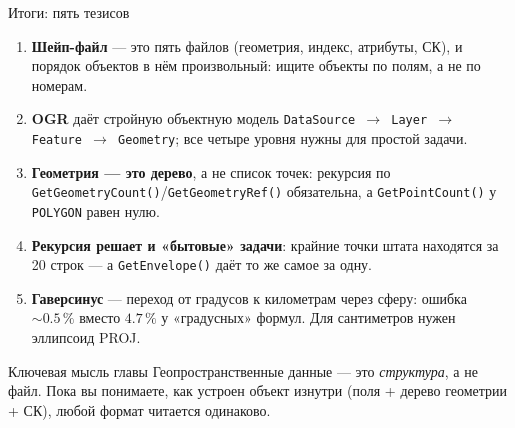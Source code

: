 \documentclass[aspectratio=169,10pt]{beamer}
\begin{document}
\begin{frame}{Итоги: пять тезисов}
\footnotesize
\begin{enumerate}\itemsep1pt
  \item \textbf{Шейп-файл} --- это пять файлов (геометрия, индекс,
        атрибуты, СК), и порядок объектов в нём произвольный: ищите
        объекты по полям, а не по номерам.
  \item \textbf{OGR} даёт стройную объектную модель
        \texttt{DataSource $\to$ Layer $\to$ Feature $\to$ Geometry};
        все четыре уровня нужны для простой задачи.
  \item \textbf{Геометрия --- это дерево}, а не список точек: рекурсия
        по \texttt{GetGeometryCount()}/\texttt{GetGeometryRef()}
        обязательна, а \texttt{GetPointCount()} у \texttt{POLYGON}
        равен нулю.
  \item \textbf{Рекурсия решает и «бытовые» задачи}: крайние точки штата
        находятся за 20 строк --- а \texttt{GetEnvelope()} даёт то же
        самое за одну.
  \item \textbf{Гаверсинус} --- переход от градусов к километрам через
        сферу: ошибка $\sim0.5\,\%$ вместо $4.7\,\%$ у «градусных»
        формул. Для сантиметров нужен эллипсоид PROJ.
\end{enumerate}

\vspace{0.6em}
\begin{block}{Ключевая мысль главы}\small
  Геопространственные данные --- это \emph{структура}, а не файл.
  Пока вы понимаете, как устроен объект изнутри (поля + дерево геометрии
  + СК), любой формат читается одинаково.
\end{block}
\end{frame}
\end{document}
